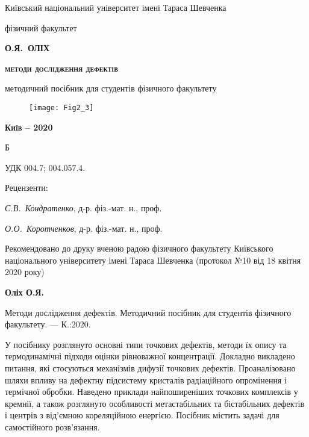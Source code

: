 \begin{titlepage}
\begin{center}

{\small Київський національний університет  імені Тараса Шевченка}

{\small фізичний факультет}


\vspace*{2cm}
{\scshape\bfseries\Large О.Я.~ОЛІХ}

\vspace*{1cm}
{\scshape\bfseries\huge методи дослідження дефектів}

\vspace*{0.5cm}
методичний посібник для студентів фізичного факультету

\end{center}
%
\vspace*{2cm}
\begin{figure}[h]\center
\texttt{[image: Fig2\_3]}
\end{figure}
%
%
\begin{center}

{\scshape\bfseries Київ -- 2020}
\end{center}
\end{titlepage}
Б

УДК 004.7; 004.057.4.

\begin{center}

 \vspace{0.04\textheight}
 Рецензенти:
\end{center}

\emph{С.В.~Кондратенко}, д-р. фіз.-мат. н., проф.

\emph{О.О.~Коротченков}, д-р. фіз.-мат. н., проф.

\vspace{1cm}
Рекомендовано до друку вченою радою фізичного факультету
Київського національного університету імені Тараса Шевченка
(протокол №10 від 18 квітня 2020 року)



\vspace{1cm}
\textbf{Оліх О.Я.}

Методи дослідження дефектів. Методичний посібник для студентів фізичного факультету. --- К.:2020.

\vspace{1cm}
У посібнику розглянуто основні типи точкових дефектів, методи їх опису та термодинамічні підходи оцінки рівноважної концентрації.
Докладно викладено питання, які стосуються механізмів дифузії точкових дефектів.
Проаналізовано шляхи впливу на дефектну підсистему кристалів радіаційного опромінення і термічної обробки.
Наведено приклади найпоширеніших точкових комплексів у кремнії, а також розглянуто особливості метастабільних та бістабільних дефектів і центрів з від’ємною кореляційною енергією. Посібник містить задачі для самостійного розв’язання.
